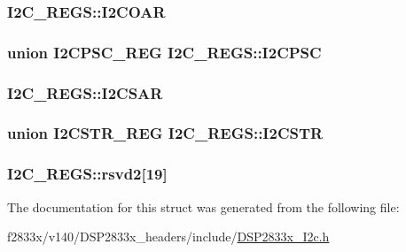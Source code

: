 \subsubsection[{I2\+C\+O\+A\+R}]{ I2\+C\+\_\+\+R\+E\+G\+S\+::\+I2\+C\+O\+A\+R}\label{struct_i2_c___r_e_g_s_a0c60cb849264d3d8c932511715d55f1d}
\hypertarget{struct_i2_c___r_e_g_s_a557e1617b1357bbaa7645d6c7489ce04}{}
\subsubsection[{I2\+C\+P\+S\+C}]{\setlength{\rightskip}{0pt plus 5cm}union {\bf I2\+C\+P\+S\+C\+\_\+\+R\+E\+G} I2\+C\+\_\+\+R\+E\+G\+S\+::\+I2\+C\+P\+S\+C}\label{struct_i2_c___r_e_g_s_a557e1617b1357bbaa7645d6c7489ce04}
\hypertarget{struct_i2_c___r_e_g_s_a4c491e1e0ad10efad5ee6b8cf80f6660}{}
\subsubsection[{I2\+C\+S\+A\+R}]{ I2\+C\+\_\+\+R\+E\+G\+S\+::\+I2\+C\+S\+A\+R}\label{struct_i2_c___r_e_g_s_a4c491e1e0ad10efad5ee6b8cf80f6660}
\hypertarget{struct_i2_c___r_e_g_s_a478b82d4d7d8b07ffa5b82cae7f60c1a}{}
\subsubsection[{I2\+C\+S\+T\+R}]{\setlength{\rightskip}{0pt plus 5cm}union {\bf I2\+C\+S\+T\+R\+\_\+\+R\+E\+G} I2\+C\+\_\+\+R\+E\+G\+S\+::\+I2\+C\+S\+T\+R}\label{struct_i2_c___r_e_g_s_a478b82d4d7d8b07ffa5b82cae7f60c1a}
\hypertarget{struct_i2_c___r_e_g_s_ab3e4a800c7b96a9c722fcd85accafd74}{}
\subsubsection[{rsvd2}]{ I2\+C\+\_\+\+R\+E\+G\+S\+::rsvd2\mbox{[}19\mbox{]}}\label{struct_i2_c___r_e_g_s_ab3e4a800c7b96a9c722fcd85accafd74}


The documentation for this struct was generated from the following file\+:\begin{DoxyCompactItemize}
\item 
f2833x/v140/\+D\+S\+P2833x\+\_\+headers/include/\hyperlink{_d_s_p2833x___i2c_8h}{D\+S\+P2833x\+\_\+\+I2c.\+h}\end{DoxyCompactItemize}
